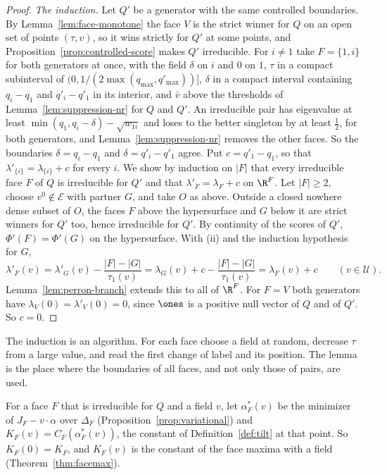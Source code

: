 \begin{proof}
\emph{The induction.} Let $Q'$ be a generator with the same controlled
boundaries. By Lemma~\ref{lem:face-monotone} the face $V$ is the strict winner
for $Q$ on an open set of points $(\tau,v)$, so it wins strictly for $Q'$ at some
points, and Proposition~\ref{prop:controlled-score} makes $Q'$ irreducible. For
$i\ne1$ take $F=\{1,i\}$ for both generators at once, with the field $\delta$ on
$i$ and $0$ on $1$, $\tau$ in a compact subinterval of
$(0,1/(2\max(q_{\max},q'_{\max}))]$, $\delta$ in a compact interval containing
$q_i-q_1$ and $q'_i-q'_1$ in its interior, and $\bar v$ above the thresholds of
Lemma~\ref{lem:suppression-nr} for $Q$ and $Q'$. An irreducible pair has
eigenvalue at least $\min(q_1,q_i-\delta)-\sqrt{w_{1i}}$ and loses to the better
singleton by at least $\frac12$, for both generators, and
Lemma~\ref{lem:suppression-nr} removes the other faces. So the boundaries
$\delta=q_i-q_1$ and $\delta=q'_i-q'_1$ agree. Put $c=q'_1-q_1$, so that
$\lambda'_{\{i\}}=\lambda_{\{i\}}+c$ for every $i$. We show by induction on $|F|$ that every irreducible face $F$ of
$Q$ is irreducible for $Q'$ and that $\lambda'_F=\lambda_F+c$ on $\R^F$. Let
$|F|\ge2$, choose $v^0\notin\mathcal E$ with partner $G$, and take $O$ as above.
Outside a closed nowhere dense subset of $O$, the faces $F$ above the
hypersurface and $G$ below it are strict winners for $Q'$ too, hence irreducible
for $Q'$. By continuity of the scores of $Q'$, $\Phi'(F)=\Phi'(G)$ on the
hypersurface. With (ii) and the induction hypothesis for $G$,
\[
 \lambda'_F(v)=\lambda'_G(v)-\frac{|F|-|G|}{\tau_1(v)}=\lambda_G(v)+c-\frac{|F|-|G|}{\tau_1(v)}=\lambda_F(v)+c
 \qquad(v\in \mathcal U).
\]
Lemma~\ref{lem:perron-branch} extends this to all of $\R^F$. For $F=V$ both
generators have $\lambda_V(0)=\lambda'_V(0)=0$, since $\ones$ is a positive null
vector of $Q$ and of $Q'$. So $c=0$.
\end{proof}

The induction is an algorithm. For each face choose a field at random,
decrease $\tau$ from a large value, and read the first change of label and its
position. The lemma is the place where the boundaries of all faces, and not only
those of pairs, are used.

For a face $F$ that is irreducible for $Q$ and a field $v$, let $\alpha^*_F(v)$
be the minimizer of $J_F-v\cdot\alpha$ over $\Delta_F$
(Proposition~\ref{prop:variational}) and $K_F(v)=C_F(\alpha^*_F(v))$, the
constant of Definition~\ref{def:tilt} at that point. So $K_F(0)=K_F$, and
$K_F(v)$ is the constant of the face maxima with a field
(Theorem~\ref{thm:facemax}).

